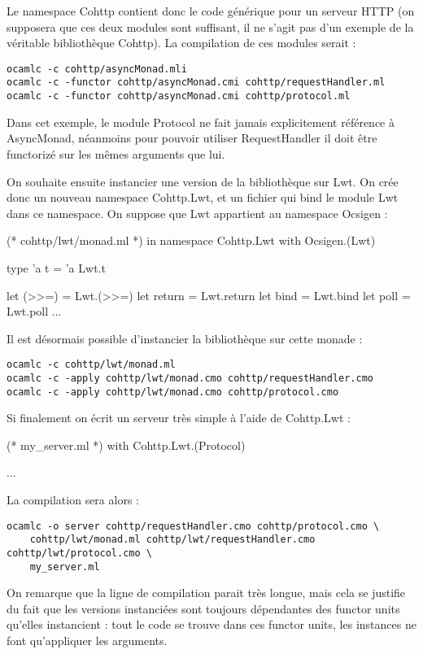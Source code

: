 \documentclass[11pt,a4paper]{report}
\begin{document}
Le namespace Cohttp contient donc le code générique pour un serveur HTTP (on
supposera que ces deux modules sont suffisant, il ne s'agit pas d'un exemple de
la véritable bibliothèque Cohttp). La compilation de ces modules serait :
\begin{verbatim}
ocamlc -c cohttp/asyncMonad.mli
ocamlc -c -functor cohttp/asyncMonad.cmi cohttp/requestHandler.ml
ocamlc -c -functor cohttp/asyncMonad.cmi cohttp/protocol.ml
\end{verbatim}

Dans cet exemple, le module Protocol ne fait jamais explicitement référence à
AsyncMonad, néanmoins pour pouvoir utiliser RequestHandler il doit être
functorizé sur les mêmes arguments que lui.

On souhaite ensuite instancier une version de la bibliothèque sur Lwt. On crée
donc un nouveau namespace Cohttp.Lwt, et un fichier qui bind le module Lwt dans
ce namespace. On suppose que Lwt appartient au namespace Ocsigen :
\begin{OCaml}
(* cohttp/lwt/monad.ml *)
in namespace Cohttp.Lwt
with Ocsigen.(Lwt)

type 'a t = 'a Lwt.t

let (>>=) = Lwt.(>>=)
let return = Lwt.return
let bind = Lwt.bind
let poll = Lwt.poll
...
\end{OCaml} 

Il est désormais possible d'instancier la bibliothèque sur cette monade :

\begin{verbatim}
ocamlc -c cohttp/lwt/monad.ml
ocamlc -c -apply cohttp/lwt/monad.cmo cohttp/requestHandler.cmo
ocamlc -c -apply cohttp/lwt/monad.cmo cohttp/protocol.cmo
\end{verbatim}

Si finalement on écrit un serveur très simple à l'aide de Cohttp.Lwt :
\begin{OCaml}
(* my_server.ml *)
with Cohttp.Lwt.(Protocol)

...
\end{OCaml}

La compilation sera alors :

\begin{verbatim}
ocamlc -o server cohttp/requestHandler.cmo cohttp/protocol.cmo \
    cohttp/lwt/monad.ml cohttp/lwt/requestHandler.cmo cohttp/lwt/protocol.cmo \
    my_server.ml 
\end{verbatim}

On remarque que la ligne de compilation parait très longue, mais cela se
justifie du fait que les versions instanciées sont toujours dépendantes des
functor units qu'elles instancient : tout le code se trouve dans ces functor
units, les instances ne font qu'appliquer les arguments.
\end{document}
